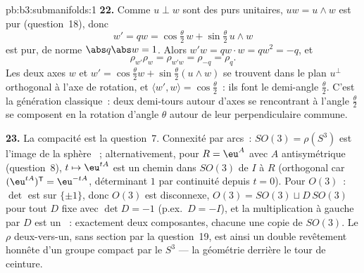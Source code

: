\begin{solution}{pb:b3:submanifolds:1}
\textbf{22.} Comme $u \perp w$ sont des purs unitaires, $uw
= u\wedge w$ est pur (question~18), donc
\[
w' = qw = \cos\tfrac\theta2\,w + \sin\tfrac\theta2\,u\wedge
w
\]
est pur, de norme $\abs q\abs w = 1$. Alors $w'w = qw\cdot
w = qw^2 = -q$, et
\[
\rho_{w'}\rho_w = \rho_{w'w} = \rho_{-q} = \rho_q .
\]
Les deux axes $w$ et $w' = \cos\frac\theta2 w +
\sin\frac\theta2(u\wedge w)$ se trouvent dans le plan
$u^\perp$ orthogonal à l'axe de rotation, et $\langle w',
w\rangle = \cos\frac\theta2$~: ils font le demi-angle
$\frac\theta2$. C'est la génération classique~: deux
demi-tours autour d'axes se rencontrant à l'angle
$\frac\theta2$ se composent en la rotation d'angle $\theta$
autour de leur perpendiculaire commune.

\textbf{23.} La compacité est la question~7. Connexité par
arcs~: $SO(3) = \rho(S^3)$ est l'image  de la
sphère ~; alternativement, pour $R =
\eu^{A}$ avec $A$ antisymétrique (question~8), $t \mapsto
\eu^{tA}$ est un chemin dans $SO(3)$ de $I$ à $R$
(orthogonal car $(\eu^{tA})^{\mathsf T} = \eu^{-tA}$,
déterminant $1$ par continuité depuis $t = 0$). Pour
$O(3)$~: $\det$ est  sur $\{\pm1\}$, donc $O(3)$
est disconnexe, $O(3) = SO(3) \sqcup D\,SO(3)$ pour tout
$D$ fixe avec $\det D = -1$ (p.ex.\ $D = -I$), et la
multiplication à gauche par $D$ est un ~:
exactement deux composantes, chacune une copie de $SO(3)$.
Le $\rho$ deux-vers-un, sans section par la question~19,
est ainsi un double revêtement honnête d'un groupe compact
 par le $S^3$  --- la géométrie
derrière le tour de ceinture.


\end{solution}
